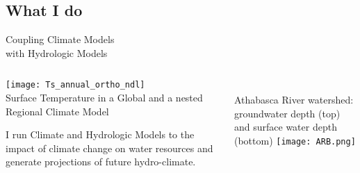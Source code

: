 \documentclass[hyperref={pdfpagelabels=false},compress,final]{beamer}
\newenvironment{myBox}[3][shadow=true]%
{\begin{center} \begin{minipage}{#2} \begin{beamerboxesrounded}[#1]{#3} \smallskip}%
      {\smallskip \end{beamerboxesrounded} \end{minipage} \end{center}}
\begin{document}
\subsection*{What I do}

\begin{frame}{\hspace{0.55\textwidth} Coupling Climate Models\\ \hspace*{0.55\textwidth} with Hydrologic Models}
  \begin{columns}
    \begin{column}{0.5\textwidth}
      \vspace*{-1.5cm}
      \texttt{[image: Ts\_annual\_ortho\_ndl]}\\
      {\scriptsize Surface Temperature in a Global and a nested Regional Climate Model}
      \begin{myBox}{0.9\textwidth}{}
        \footnotesize I run Climate and Hydrologic Models to the impact of climate change on water resources and generate projections of future hydro-climate.
      \end{myBox}
    \end{column}
    \begin{column}{0.5\textwidth}
      \vspace*{.25cm}\\
      \scriptsize Athabasca River watershed: \\ groundwater depth (top) and surface water depth (bottom)
      \texttt{[image: ARB.png]}
    \end{column}
  \end{columns}
\end{frame}
\end{document}
